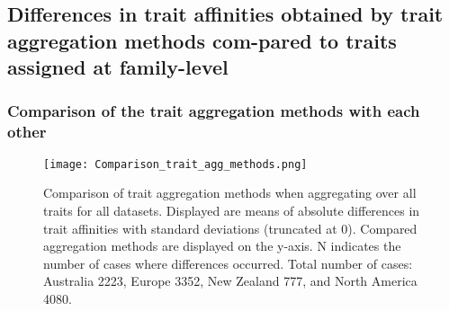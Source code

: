 \documentclass[../Draft_harmonization_paper.tex]{subfiles}
\begin{document}
\subsection*{Differences in trait affinities obtained by trait aggregation methods com-pared to traits assigned at family-level}

\subsubsection*{Comparison of the trait aggregation methods with each other}
\label{sec:compa_aggr_methods}

\begin{figure}[H]
    \centering
    \texttt{[image: Comparison\_trait\_agg\_methods.png]}
    \caption{Comparison of trait aggregation methods when aggregating over all traits for all datasets. Displayed are means of absolute differences in trait affinities with standard deviations (truncated at 0). Compared aggregation methods are displayed on the y-axis. N indicates the number of cases where differences occurred. Total number of cases: Australia 2223, Europe 3352, New Zealand 777, and North America 4080.}
    \label{fig:comp_aggr_methods}
\end{figure}

 

\end{document}
